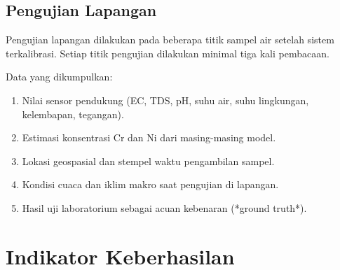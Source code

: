 \documentclass[12pt,a4paper]{article}
\begin{document}
\subsection{Pengujian Lapangan}

Pengujian lapangan dilakukan pada beberapa titik sampel air setelah sistem terkalibrasi. Setiap titik pengujian dilakukan minimal tiga kali pembacaan.

Data yang dikumpulkan:

\begin{enumerate}
    \item Nilai sensor pendukung (EC, TDS, pH, suhu air, suhu lingkungan, kelembapan, tegangan).
    \item Estimasi konsentrasi Cr dan Ni dari masing-masing model.
    \item Lokasi geospasial dan stempel waktu pengambilan sampel.
    \item Kondisi cuaca dan iklim makro saat pengujian di lapangan.
    \item Hasil uji laboratorium sebagai acuan kebenaran (*ground truth*).
\end{enumerate}

\section{Indikator Keberhasilan}
\end{document}
